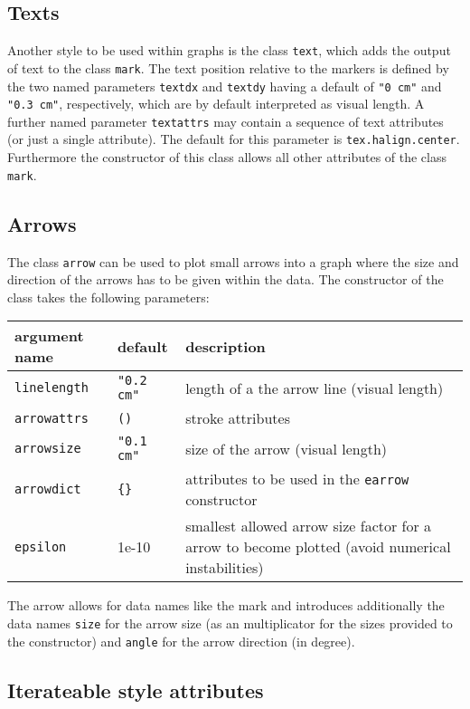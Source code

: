 \subsection{Texts}

Another style to be used within graphs is the class \verb|text|, which
adds the output of text to the class \verb|mark|. The text
position relative to the markers is defined by the two named
parameters \verb|textdx| and \verb|textdy| having a default of
\verb|"0 cm"| and \verb|"0.3 cm"|, respectively, which are by default
interpreted as visual length. A further named parameter
\verb|textattrs| may contain a sequence of text attributes (or just a
single attribute). The default for this parameter is
\verb|tex.halign.center|. Furthermore the constructor of this class
allows all other attributes of the class \verb|mark|.

\subsection{Arrows}

The class \verb|arrow| can be used to plot small arrows into a graph
where the size and direction of the arrows has to be given within the
data. The constructor of the class takes the following parameters:

\medskip
\begin{tabularx}{\linewidth}{ll>{\raggedright\arraybackslash}X}
argument name&default&description\\
\hline
\texttt{linelength}&\texttt{"0.2 cm"}&length of a the arrow line (visual length)\\
\texttt{arrowattrs}&\texttt{()}&stroke attributes\\
\texttt{arrowsize}&\texttt{"0.1 cm"}&size of the arrow (visual length)\\
\texttt{arrowdict}&\texttt{\{\}}&attributes to be used in the \texttt{earrow} constructor\\
\texttt{epsilon}&1e-10&smallest allowed arrow size factor for a arrow to become plotted (avoid numerical instabilities)\\
\end{tabularx}
\medskip

The arrow allows for data names like the mark and introduces
additionally the data names \verb|size| for the arrow size (as an
multiplicator for the sizes provided to the constructor) and
\verb|angle| for the arrow direction (in degree).

\subsection{Iterateable style attributes}
\label{graph:changeattrs}

